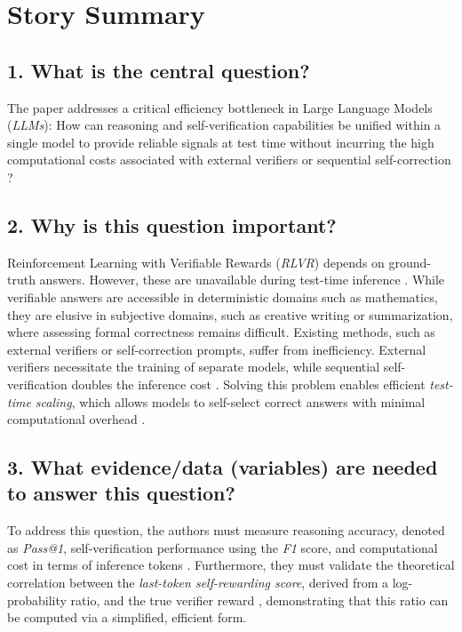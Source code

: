 \documentclass[a4paper,oneside,10pt,ngerman,english]{scrartcl}
\begin{document}
\section{Story Summary}
\label{sec:storysummary}

\subsection*{1. What is the central question?}
The paper addresses a critical efficiency bottleneck in Large Language Models (\textit{LLMs}): How can reasoning and self-verification capabilities be unified within a single model to provide reliable signals at test time without incurring the high computational costs associated with external verifiers or sequential self-correction \citep{laser}?

\subsection*{2. Why is this question important?}
Reinforcement Learning with Verifiable Rewards (\textit{RLVR}) depends on ground-truth answers. However, these are unavailable during test-time inference \citep{laser}. While verifiable answers are accessible in deterministic domains such as mathematics, they are elusive in subjective domains, such as creative writing or summarization, where assessing formal correctness remains difficult. Existing methods, such as external verifiers or self-correction prompts, suffer from inefficiency. External verifiers necessitate the training of separate models, while sequential self-verification doubles the inference cost \citep{laser}. Solving this problem enables efficient \textit{test-time scaling}, which allows models to self-select correct answers with minimal computational overhead \citep{laser}.

\subsection*{3. What evidence/data (variables) are needed to answer this question?}
To address this question, the authors must measure reasoning accuracy, denoted as \textit{Pass@1}, self-verification performance using the \textit{F1} score, and computational cost in terms of inference tokens \citep{laser}. Furthermore, they must validate the theoretical correlation between the \textit{last-token self-rewarding score}, derived from a log-probability ratio, and the true verifier reward \citep{laser}, demonstrating that this ratio can be computed via a simplified, efficient form.
\end{document}
